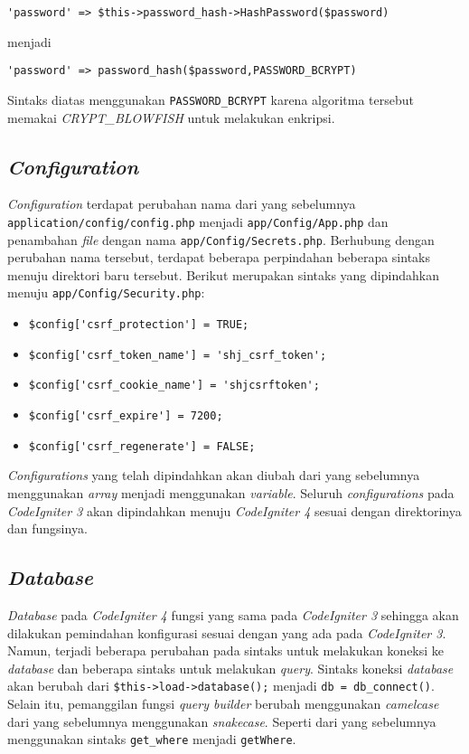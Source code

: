\begin{center}
\verb|'password' => $this->password_hash->HashPassword($password)|
\end{center}
menjadi
\begin{center}
\verb|'password' => password_hash($password,PASSWORD_BCRYPT)|
\end{center}

Sintaks diatas menggunakan \texttt{PASSWORD\_BCRYPT} karena algoritma tersebut memakai \textit{CRYPT\_BLOWFISH} untuk melakukan enkripsi.

\subsection{\textit{Configuration}}
\textit{Configuration} terdapat perubahan nama dari yang sebelumnya \texttt{application/config/config.php} menjadi \texttt{app/Config/App.php} dan penambahan \textit{file} dengan nama \texttt{app/Config/Secrets.php}. Berhubung dengan perubahan nama tersebut, terdapat beberapa perpindahan beberapa sintaks menuju direktori baru tersebut. Berikut merupakan sintaks yang dipindahkan menuju \texttt{app/Config/Security.php}:
\begin{itemize}
\item \verb|$config['csrf_protection'] = TRUE;|
\item \verb|$config['csrf_token_name'] = 'shj_csrf_token';|
\item \verb|$config['csrf_cookie_name'] = 'shjcsrftoken';|
\item \verb|$config['csrf_expire'] = 7200;|
\item \verb|$config['csrf_regenerate'] = FALSE;|
\end{itemize}

\textit{Configurations} yang telah dipindahkan akan diubah dari yang sebelumnya menggunakan \textit{array} menjadi menggunakan \textit{variable}. Seluruh \textit{configurations} pada \textit{CodeIgniter 3} akan dipindahkan menuju \textit{CodeIgniter 4} sesuai dengan direktorinya dan fungsinya.

\subsection{\textit{Database}}
\textit{Database} pada \textit{CodeIgniter 4} fungsi yang sama pada \textit{CodeIgniter 3} sehingga akan dilakukan pemindahan konfigurasi sesuai dengan yang ada pada \textit{CodeIgniter 3}. Namun, terjadi beberapa perubahan pada sintaks untuk melakukan koneksi ke \textit{database} dan beberapa sintaks untuk melakukan \textit{query}. Sintaks koneksi \textit{database} akan berubah dari \texttt{\$this->load->database();} menjadi \texttt{db = db\_connect()}. Selain itu, pemanggilan fungsi \textit{query builder} berubah menggunakan \textit{camelcase} dari yang sebelumnya menggunakan \textit{snakecase}. Seperti dari yang sebelumnya menggunakan sintaks \texttt{get\_where} menjadi \texttt{getWhere}.

